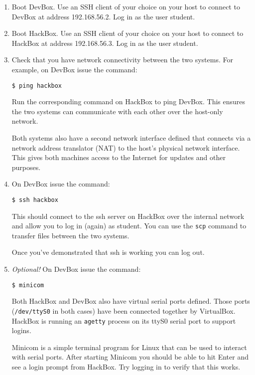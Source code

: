 \documentclass{article}
\begin{document}
\begin{enumerate}

\item Boot DevBox. Use an SSH client of your choice on your host to connect to DevBox at address
192.168.56.2. Log in as the user student.

\item Boot HackBox. Use an SSH client of your choice on your host to connect to HackBox at
address 192.168.56.3. Log in as the user student.

\item Check that you have network connectivity between the two systems. For example, on DevBox
  issue the command:
\begin{Verbatim}
$ ping hackbox
\end{Verbatim}
  Run the corresponding command on HackBox to ping DevBox. This ensures the two systems can
  communicate with each other over the host-only network.

  Both systems also have a second network interface defined that connects via a network address
  translator (NAT) to the host's physical network interface. This gives both machines access to
  the Internet for updates and other purposes.

\item On DevBox issue the command:
\begin{Verbatim}
$ ssh hackbox
\end{Verbatim}
  This should connect to the ssh server on HackBox over the internal network and allow you to
  log in (again) as student. You can use the \texttt{scp} command to transfer files between the
  two systems.

  Once you've demonstrated that ssh is working you can log out.

\item \textit{Optional!} On DevBox issue the command:
\begin{Verbatim}
$ minicom
\end{Verbatim}
  Both HackBox and DevBox also have virtual serial ports defined. Those ports
  (\texttt{/dev/ttyS0} in both cases) have been connected together by VirtualBox. HackBox is
  running an \texttt{agetty} process on its ttyS0 serial port to support logins.

  Minicom is a simple terminal program for Linux that can be used to interact with serial ports.
  After starting Minicom you should be able to hit Enter and see a login prompt from HackBox.
  Try logging in to verify that this works.


\end{enumerate}
\end{document}

